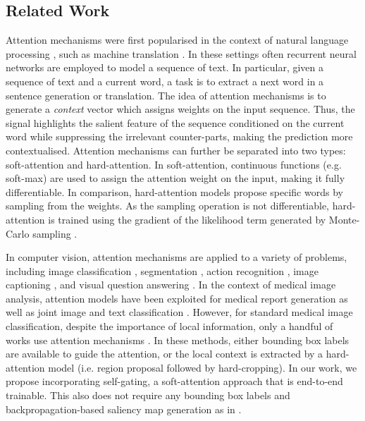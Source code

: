 \documentclass{article}
\begin{document}
\subsection{Related Work}

Attention mechanisms were first popularised in the context of natural language processing \cite{shen2017disan}, such as machine translation \cite{bahdanau2014neural, DBLP:journals/corr/LuongPM15}. In these settings often recurrent neural networks are employed to model a sequence of text. In particular, given a sequence of text and a current word, a task is to extract a next word in a sentence generation or translation. The idea of attention mechanisms is to generate a \emph{context} vector which assigns weights on the input sequence. Thus, the signal highlights the salient feature of the sequence conditioned on the current word while suppressing the irrelevant counter-parts, making the prediction more contextualised. Attention mechanisms can further be separated into two types: soft-attention and hard-attention. In soft-attention, continuous functions (e.g. soft-max) are used to assign the attention weight on the input, making it fully differentiable. In comparison, hard-attention models propose specific words by sampling from the weights. As the sampling operation is not differentiable, hard-attention is trained using the gradient of the likelihood term generated by Monte-Carlo sampling \cite{xu2015show}. 

In computer vision, attention mechanisms are applied to a variety of problems, including image classification \cite{jetley2018learn, wang2017residual, zhao2017survey}, segmentation \cite{DBLP:journals/corr/RenZ16}, action recognition \cite{liu2017global,DBLP:journals/corr/PeiBTM16,wang2017non}, image captioning \cite{xu2015show, lu2017knowing}, and visual question answering \cite{DBLP:journals/corr/YangHGDS15, DBLP:journals/corr/NamHK16}. In the context of medical image analysis, attention models have been exploited for medical report generation \cite{zhang2017mdnet, zhang2017tandemnet} as well as joint image and text classification \cite{DBLP:journals/corr/abs-1801-04334}. However, for standard medical image classification, despite the importance of local information, only a handful of works use attention mechanisms  \cite{pesce2017learning, guan2018diagnose}. In these methods, either bounding box labels are available to guide the attention, or the local context is extracted by a hard-attention model (i.e. region proposal followed by hard-cropping). In our work, we propose incorporating self-gating, a soft-attention approach that is end-to-end trainable. This also does not require any bounding box labels and backpropagation-based saliency map generation as in \cite{baumgartner2016real}.
\end{document}
